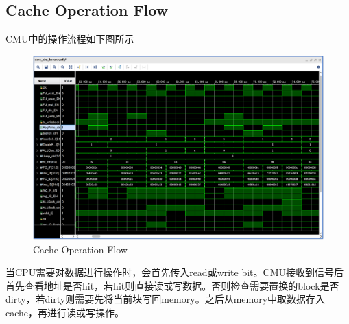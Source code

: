 \subsection{Cache Operation Flow}
CMU中的操作流程如下图所示
\begin{figure}[H] %
	\centering %
	\includegraphics[width=1.0\textwidth]{figs/3.png} %
	\caption{Cache Operation Flow} %
	\label{Fig.2} %
\end{figure}
当CPU需要对数据进行操作时，会首先传入read或write bit。CMU接收到信号后首先查看地址是否hit，若hit则直接读或写数据。否则检查需要置换的block是否dirty，若dirty则需要先将当前块写回memory。之后从memory中取数据存入cache，再进行读或写操作。
